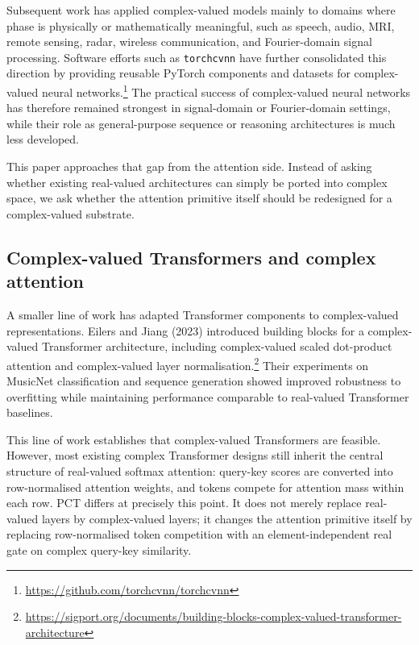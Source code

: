 \documentclass[11pt,a4paper]{article}
\theoremstyle{plain}
\theoremstyle{definition}
\begin{document}
Subsequent work has applied complex-valued models mainly to domains where phase is physically or mathematically meaningful, such as speech, audio, MRI, remote sensing, radar, wireless communication, and Fourier-domain signal processing. Software efforts such as \texttt{torchcvnn} have further consolidated this direction by providing reusable PyTorch components and datasets for complex-valued neural networks.\footnote{\url{https://github.com/torchcvnn/torchcvnn}} The practical success of complex-valued neural networks has therefore remained strongest in signal-domain or Fourier-domain settings, while their role as general-purpose sequence or reasoning architectures is much less developed.

This paper approaches that gap from the attention side. Instead of asking whether existing real-valued architectures can simply be ported into complex space, we ask whether the attention primitive itself should be redesigned for a complex-valued substrate.

\subsection{Complex-valued Transformers and complex attention}
A smaller line of work has adapted Transformer components to complex-valued representations. Eilers and Jiang (2023) introduced building blocks for a complex-valued Transformer architecture, including complex-valued scaled dot-product attention and complex-valued layer normalisation.\footnote{\url{https://sigport.org/documents/building-blocks-complex-valued-transformer-architecture}} Their experiments on MusicNet classification and sequence generation showed improved robustness to overfitting while maintaining performance comparable to real-valued Transformer baselines.

This line of work establishes that complex-valued Transformers are feasible. However, most existing complex Transformer designs still inherit the central structure of real-valued softmax attention: query-key scores are converted into row-normalised attention weights, and tokens compete for attention mass within each row. PCT differs at precisely this point. It does not merely replace real-valued layers by complex-valued layers; it changes the attention primitive itself by replacing row-normalised token competition with an element-independent real gate on complex query-key similarity.
\end{document}
